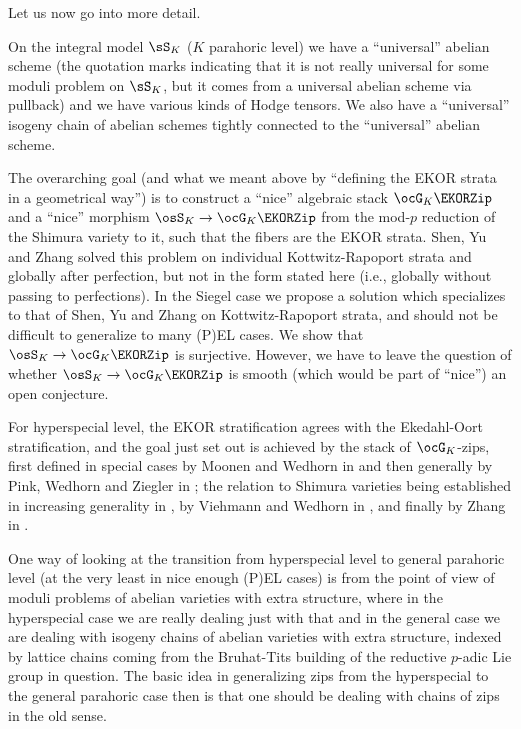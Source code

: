 \documentclass[a4paper]{scrartcl} %
\numberwithin{equation}{section}
\begin{document}
Let us now go into more detail.

On the integral model $\sS_K$ ($K$ parahoric level) we have a ``universal'' abelian scheme (the quotation marks indicating that it is not really universal for some moduli problem on $\sS_K$, but it comes from a universal abelian scheme via pullback) and we have various kinds of Hodge tensors. We also have a ``universal'' isogeny chain of abelian schemes tightly connected to the ``universal'' abelian scheme. 

The overarching goal (and what we meant above by ``defining the EKOR strata in a geometrical way'') is to construct a ``nice'' algebraic stack $\ocG_K\EKORZip$ and a ``nice'' morphism $\osS_K\to\ocG_K\EKORZip$ from the mod-$p$ reduction of the Shimura variety to it, such that the fibers are the EKOR strata. Shen, Yu and Zhang \cite{SYZnew} solved this problem on individual Kottwitz-Rapoport strata and globally after perfection, but not in the form stated here (i.e., globally without passing to perfections). In the Siegel case we propose a solution which specializes to that of Shen, Yu and Zhang on Kottwitz-Rapoport strata, and should not be difficult to generalize to many (P)EL cases. We show that $\osS_K\to\ocG_K\EKORZip$ is surjective. However, we have to leave the question of whether $\osS_K\to\ocG_K\EKORZip$ is smooth (which would be part of ``nice'') an open conjecture.

For hyperspecial level, the EKOR stratification agrees with the Ekedahl-Oort stratification, and the goal just set out is achieved by the stack of $\ocG_K$-zips, first defined in special cases by Moonen and Wedhorn in \cite{mw} and then generally by Pink, Wedhorn and Ziegler in \cite{PWZ-AZD,PWZ}; the relation to Shimura varieties being established in increasing generality in \cite{mw}, by Viehmann and Wedhorn in \cite{vieh-wed}, and finally by Zhang in \cite{zhang}.

One way of looking at the transition from hyperspecial level to general parahoric level (at the very least in nice enough (P)EL cases) is from the point of view of moduli problems of abelian varieties with extra structure, where in the hyperspecial case we are really dealing just with that and in the general case we are dealing with isogeny chains of abelian varieties with extra structure, indexed by lattice chains coming from the Bruhat-Tits building of the reductive $p$-adic Lie group in question.
The basic idea in generalizing zips from the hyperspecial to the general parahoric case then is that one should be dealing with chains of zips in the old sense.
\end{document}
